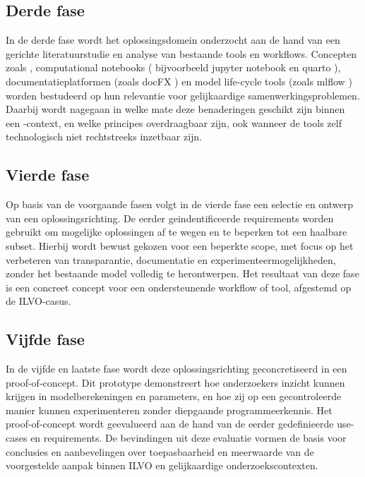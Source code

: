 \subsection{Derde fase}
In de derde fase wordt het oplossingsdomein onderzocht aan de hand van een gerichte literatuurstudie en analyse van bestaande tools en workflows. Concepten zoals \textcite{LiterateProgramming}, computational notebooks ( bijvoorbeeld jupyter notebook \autocite{jupyternotebook} en quarto \autocite{quarto2025}), documentatieplatformen (zoals docFX \autocite{docfx}) en model life-cycle tools (zoals mlflow \autocite{mlflow}) worden bestudeerd op hun relevantie voor gelijkaardige samenwerkingsproblemen. Daarbij wordt nagegaan in welke mate deze benaderingen geschikt zijn binnen een -context, en welke principes overdraagbaar zijn, ook wanneer de tools zelf technologisch niet rechtstreeks inzetbaar zijn.

\subsection{Vierde fase}
Op basis van de voorgaande fasen volgt in de vierde fase een selectie en ontwerp van een oplossingsrichting. De eerder geindentificeerde requirements worden gebruikt om mogelijke oplossingen af te wegen en te beperken tot een haalbare subset. Hierbij wordt bewust gekozen voor een beperkte scope, met focus op het verbeteren van transparantie, documentatie en experimenteermogelijkheden, zonder het bestaande model volledig te herontwerpen. Het resultaat van deze fase is een concreet concept voor een ondersteunende workflow of tool, afgestemd op de ILVO-casus.

\subsection{Vijfde fase}
In de vijfde en laatste fase wordt deze oplossingsrichting geconcretiseerd in een proof-of-concept. Dit prototype demonstreert hoe onderzoekers inzicht kunnen krijgen in modelberekeningen en parameters, en hoe zij op een gecontroleerde manier kunnen experimenteren zonder diepgaande programmeerkennis. Het proof-of-concept wordt geevalueerd aan de hand van de eerder gedefinieerde use-cases en requirements. De bevindingen uit deze evaluatie vormen de basis voor conclusies en aanbevelingen over toepasbaarheid en meerwaarde van de voorgestelde aanpak binnen ILVO en gelijkaardige onderzoekscontexten.
